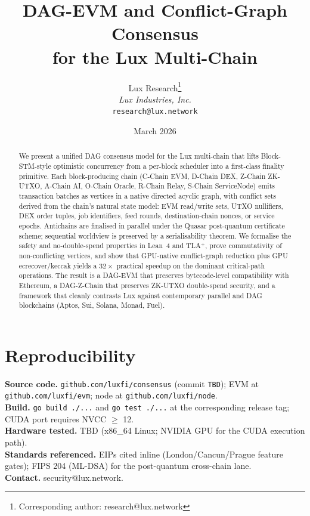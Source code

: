 \documentclass[11pt]{article}
\title{DAG-EVM and Conflict-Graph Consensus\\for the Lux Multi-Chain}
\author{
Lux Research\thanks{Corresponding author: research@lux.network}\\
\textit{Lux Industries, Inc.}\\
\texttt{research@lux.network}
}
\date{March 2026}
\theoremstyle{definition}
\begin{document}
\luxcoverpage

\begin{abstract}
We present a unified DAG consensus model for the Lux multi-chain that lifts
Block-STM-style optimistic concurrency from a per-block scheduler into a
first-class finality primitive. Each block-producing chain (C-Chain EVM,
D-Chain DEX, Z-Chain ZK-UTXO, A-Chain AI, O-Chain Oracle, R-Chain Relay,
S-Chain ServiceNode) emits transaction batches as vertices in a native
directed acyclic graph, with conflict sets derived from the chain's natural
state model: EVM read/write sets, UTXO nullifiers, DEX order tuples,
job identifiers, feed rounds, destination-chain nonces, or service epochs.
Antichains are finalised in parallel under the Quasar post-quantum
certificate scheme; sequential worldview is preserved by a serialisability
theorem. We formalise the safety and no-double-spend properties in Lean~4
and TLA$^+$, prove commutativity of non-conflicting vertices, and show that
GPU-native conflict-graph reduction plus GPU ecrecover/keccak yields a
$32\times$ practical speedup on the dominant critical-path operations. The
result is a DAG-EVM that preserves bytecode-level compatibility with
Ethereum, a DAG-Z-Chain that preserves ZK-UTXO double-spend security, and a
framework that cleanly contrasts Lux against contemporary parallel and
DAG blockchains (Aptos, Sui, Solana, Monad, Fuel).
\end{abstract}

\tableofcontents
\newpage



















\appendix
\section*{Reproducibility}
\textbf{Source code.} \texttt{github.com/luxfi/consensus} (commit \texttt{TBD}); EVM at \texttt{github.com/luxfi/evm}; node at \texttt{github.com/luxfi/node}.\\
\textbf{Build.} \texttt{go build ./...} and \texttt{go test ./...} at the corresponding release tag; CUDA port requires NVCC \(\geq\) 12.\\
\textbf{Hardware tested.} TBD (x86\_64 Linux; NVIDIA GPU for the CUDA execution path).\\
\textbf{Standards referenced.} EIPs cited inline (London/Cancun/Prague feature gates); FIPS 204 (ML-DSA) for the post-quantum cross-chain lane.\\
\textbf{Contact.} security@lux.network.
\end{document}
